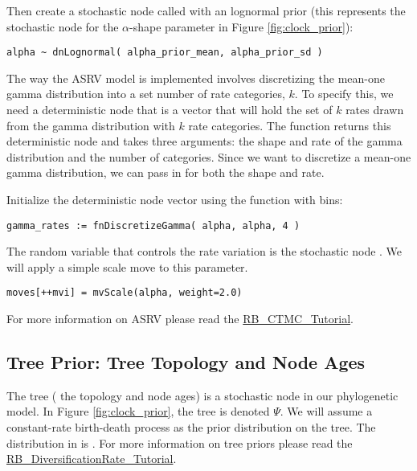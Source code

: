 Then create a stochastic node called  with an lognormal prior (this represents the stochastic node for the $\alpha$-shape parameter in Figure \ref{fig:clock_prior}):
{\tt\begin{snugshade*}
\begin{lstlisting}
alpha ~ dnLognormal( alpha_prior_mean, alpha_prior_sd )
\end{lstlisting}
\end{snugshade*}}

The way the ASRV model is implemented involves discretizing the mean-one gamma distribution into a set number of rate categories, $k$. 
To specify this, we need a deterministic node that is a vector that will hold the set of $k$ rates drawn from the gamma distribution with $k$ rate categories. 
The  function returns this deterministic node and takes three arguments: the shape and rate of the gamma distribution and the number of categories. 
Since we want to discretize a mean-one gamma distribution, we can pass in  for both the shape and rate.

Initialize the  deterministic node vector using the   function with  bins:
{\tt \begin{snugshade*}
\begin{lstlisting}
gamma_rates := fnDiscretizeGamma( alpha, alpha, 4 )
\end{lstlisting}
\end{snugshade*}}

The random variable that controls the rate variation is the stochastic node . 
We will apply a simple scale move to this parameter.
{\tt \begin{snugshade*}
\begin{lstlisting}
moves[++mvi] = mvScale(alpha, weight=2.0)
\end{lstlisting}
\end{snugshade*}}

For more information on ASRV please read the \href{https://github.com/revbayes/revbayes_tutorial/raw/master/tutorial_TeX/RB_CTMC_Tutorial/RB_CTMC_Tutorial.pdf}{RB\_CTMC\_Tutorial}.



\subsection{Tree Prior: Tree Topology and Node Ages}

The tree ( the topology and node ages) is a stochastic node in our phylogenetic model. 
In Figure \ref{fig:clock_prior}, the tree is denoted $\Psi$.
We will assume a constant-rate birth-death process as the prior distribution on the tree.
The distribution in \RevBayes is . 
For more information on tree priors please read the \href{https://github.com/revbayes/revbayes_tutorial/raw/master/tutorial_TeX/RB_DiversificationRate_Tutorial/RB_Diversification_Tutorial.pdf}{RB\_DiversificationRate\_Tutorial}.

